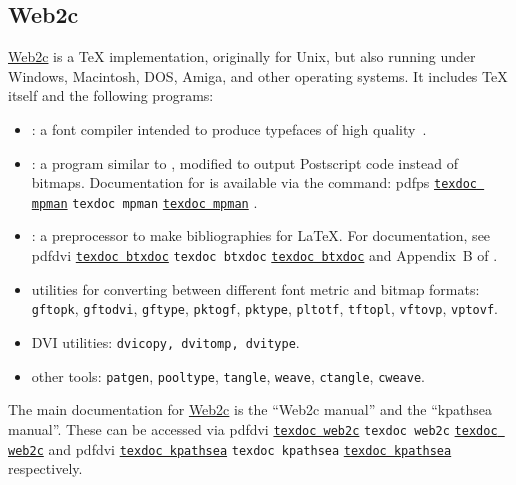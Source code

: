 \documentclass[11pt,a4paper]{article}
\newcommand{\psext}{ps}
\newcommand{\pdfext}{pdf}
\newcommand{\dviext}{dvi}
\let\docext=\pdfext
\let\docext=\dviext
\newcommand{\dlink}[3]{%
  \ifpdf
    \ifx\pdfext#3
      \href{#1/#2.#3}{\texttt{texdoc #2}}%
    \else
      \texttt{texdoc #2}%
    \fi
  \else
     \href{#1/#2.#3}{\mbox{\texttt{texdoc #2}}}%
  \fi}
\begin{document}
\subsection{Web2c}
\href{http://tug.org/web2c/}{Web2c} is a \TeX{} implementation,
originally for Unix, but also running under Windows, Macintosh,
DOS, Amiga, and other operating systems. It includes \TeX{} itself and
the following programs:
\begin{itemize}
\item \MF: a font compiler intended to produce typefaces of high
  quality~\cite{Knuth:1984:M}.
\item \MP: a program similar to \MF, modified to output Postscript
  code instead of bitmaps. Documentation for \MP{} is available via
  the command:
  \dlink{../../../texmf-dist/doc/metapost/base}{mpman}{\psext}.
\item \BibTeX: a preprocessor to make bibliographies for \LaTeX. For
  documentation, see
  \dlink{../../../texmf-dist/doc/bibtex/base}{btxdoc}{\dviext} and
  Appendix~B of \cite{Lamport:1994:LDP}.
\item utilities for converting between different font metric and
  bitmap formats: \texttt{gftopk}, \texttt{gftodvi}, \texttt{gftype},
  \texttt{pktogf}, \texttt{pktype}, \texttt{pltotf}, \texttt{tftopl},
  \texttt{vftovp}, \texttt{vptovf}.
\item DVI utilities: \texttt{dvicopy, dvitomp, dvitype}.
\item other tools: \texttt{patgen}, \texttt{pooltype},
  \texttt{tangle}, \texttt{weave}, \texttt{ctangle}, \texttt{cweave}.
\end{itemize}
  
  
The main documentation for \href{http://tug.org/web2c/}{Web2c} is the
``Web2c manual'' and the ``kpathsea manual''. These can be accessed
via \dlink{../../../texmf-dist/doc/programs}{web2c}{\docext} and
\dlink{../../../texmf-dist/doc/programs}{kpathsea}{\docext}
respectively.
\end{document}

